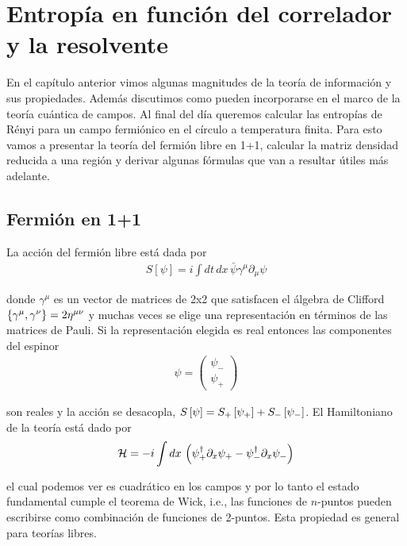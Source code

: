 \documentclass[../main.tex]{subfiles}
\begin{document}
\setcounter{chapter}{2}
\chapter{Entropía en función del correlador y la resolvente}

En el capítulo anterior vimos algunas magnitudes de la teoría de información y sus propiedades. Además discutimos como pueden incorporarse en el marco de la teoría cuántica de campos. Al final del día queremos calcular las entropías de Rényi para un campo fermiónico en el círculo a temperatura finita. Para esto vamos a presentar la teoría del fermión libre en 1+1, calcular la matriz densidad reducida a una región y derivar algunas fórmulas que van a resultar útiles más adelante.

\section{Fermión en 1+1}

La acción del fermión libre está dada por
\begin{align}
	S[\psi] = i \int dt\, dx\, \bar \psi \gamma^\mu \partial_\mu \psi
\end{align}

\noindent donde $\gamma^\mu$ es un vector de matrices de 2x2 que satisfacen el álgebra de Clifford $\left \{ \gamma^\mu, \gamma^\nu \right \} = 2 \eta^{\mu \nu}$ y muchas veces se elige una representación en términos de las matrices de Pauli. Si la representación elegida es real entonces las componentes del espinor
\begin{align}
	\psi =
	\begin{pmatrix}
		\psi_- \\
		\psi_+
	\end{pmatrix}
\end{align}

\noindent son reales y la acción se desacopla, $S\left [ \psi \right ] = S_+\left [ \psi_+ \right ] + S_-\left [ \psi_- \right ]$. El Hamiltoniano de la teoría está dado por
\begin{align}
	\mathcal H = -i \int dx\, \left ( \psi_+^\dagger \partial_x \psi_+ - \psi_-^\dagger \partial_x \psi_- \right )
\end{align}

\noindent el cual podemos ver es cuadrático en los campos y por lo tanto el estado fundamental cumple el teorema de Wick, i.e., las funciones de $n$-puntos pueden escribirse como combinación de funciones de 2-puntos. Esta propiedad es general para teorías libres.
\end{document}
